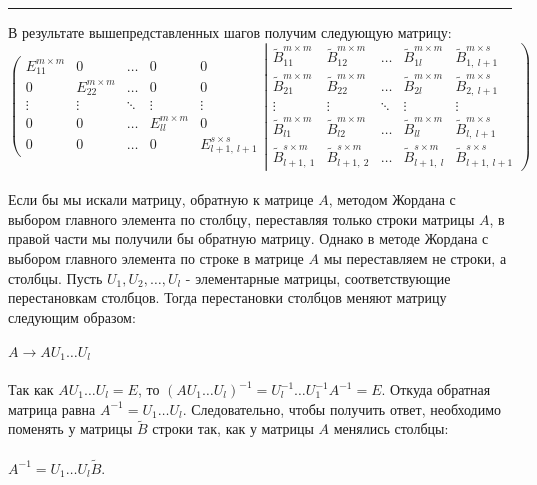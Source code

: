 \documentclass[14pt,a4paper, openany]{article}
\begin{document}
	\noindent\rule{\textwidth}{1pt}
	\indent В результате вышепредставленных шагов получим следующую матрицу:\\
	$$
	\left (
	\begin{matrix} 
	E_{11}^{m \times m} & 0 & \ldots & 0 & 0 \\
	0 & E_{22}^{m \times m} & \ldots & 0 & 0 \\
	\vdots  & \vdots & \ddots & \vdots & \vdots \\
	0 & 0 & \ldots & E_{ll}^{m \times m} & 0 \\
	0 & 0 & \ldots & 0 & E_{l+1,\ l+1}^{s \times s}
	\end{matrix}
	\right .
	\left |
	\begin{matrix} 
	\tilde B_{11}^{m \times m} & \tilde B_{12}^{m \times m} & \ldots & \tilde B_{1l}^{m \times m} & \tilde B_{1,\ l+1}^{m \times s} \\
	\tilde B_{21}^{m \times m} & \tilde B_{22}^{m \times m} & \ldots & \tilde B_{2l}^{m \times m} & \tilde B_{2,\ l+1}^{m \times s} \\
	\vdots  & \vdots & \ddots & \vdots & \vdots \\
	\tilde B_{l1}^{m \times m} & \tilde B_{l2}^{m \times m} & \ldots & \tilde B_{ll}^{m \times m} & \tilde B_{l,\ l+1}^{m \times s} \\
	\tilde B_{l+1,\ 1}^{s \times m} & \tilde B_{l+1,\ 2}^{s \times m} & \ldots & \tilde B_{l+1,\ l}^{s \times m} & \tilde B_{l+1,\ l+1}^{s \times s}
	\end{matrix}
	\right )
	$$\\
	\indent Если бы мы искали матрицу, обратную к матрице $A$, методом Жордана с выбором главного элемента по столбцу, переставляя только строки матрицы $A$, в правой части мы получили бы обратную матрицу. Однако в методе Жордана с выбором главного элемента по строке в матрице $A$ мы переставляем не строки, а столбцы. Пусть $U_1, U_2,\ldots, U_l$ - элементарные матрицы, соответствующие перестановкам столбцов. Тогда перестановки столбцов меняют матрицу следующим образом:\\ \\
	$A \longrightarrow AU_1\ldots U_l$\\ \\
	Так как $AU_1\ldots U_l = E$, то
	$(AU_1\ldots U_l)^{-1} = U_l^{-1}\ldots U_1^{-1}A^{-1} = E$.
	Откуда обратная матрица равна $A^{-1} = U_1\ldots U_l$. 
	Следовательно, чтобы получить ответ, необходимо поменять у матрицы $\tilde B$ строки так, как у матрицы $A$ менялись столбцы: \\ \\
	$A^{-1} = U_1\ldots U_l\tilde B$.
\end{document}
